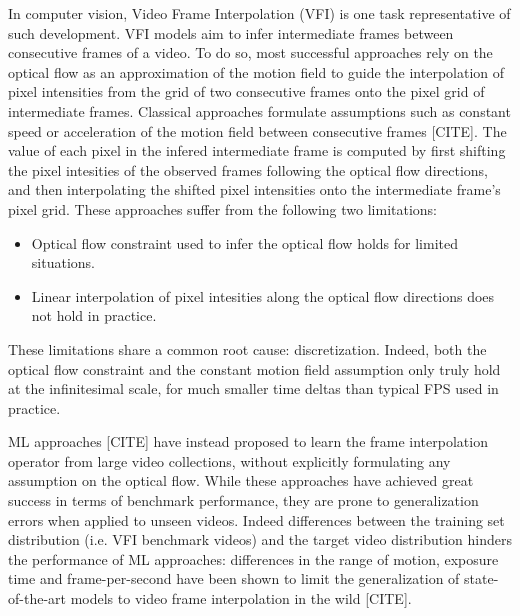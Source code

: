 \documentclass{article}
\begin{document}
In computer vision, Video Frame Interpolation (VFI) is one task representative of such development.
VFI models aim to infer intermediate frames between consecutive frames of a video.
To do so, most successful approaches rely on the optical flow as an approximation of the motion field
to guide the interpolation of pixel intensities from the grid of two consecutive frames onto the pixel grid of intermediate frames.
Classical approaches formulate assumptions such as constant speed or acceleration of the motion field between consecutive frames [CITE].
The value of each pixel in the infered intermediate frame is computed by first shifting the pixel intesities of the observed frames following the
optical flow directions, and then interpolating the shifted pixel intensities onto the intermediate frame's pixel grid.
These approaches suffer from the following two limitations:

\begin{itemize}
\item Optical flow constraint used to infer the optical flow holds for limited situations. %
\item Linear interpolation of pixel intesities along the optical flow directions does not hold in practice. %
\end{itemize}

These limitations share a common root cause: discretization.
Indeed, both the optical flow constraint and the constant motion field assumption only truly hold at the infinitesimal scale,
for much smaller time deltas than typical FPS used in practice.

ML approaches [CITE] have instead proposed to learn the frame interpolation operator from large video collections,
without explicitly formulating any assumption on the optical flow.
While these approaches have achieved great success in terms of benchmark performance,
they are prone to generalization errors when applied to unseen videos. %
Indeed differences between the training set distribution (i.e. VFI benchmark videos) and the target video distribution hinders the performance of ML approaches:
differences in the range of motion, exposure time and frame-per-second have been shown to limit the
generalization of state-of-the-art models to video frame interpolation in the wild [CITE]. %
\end{document}
